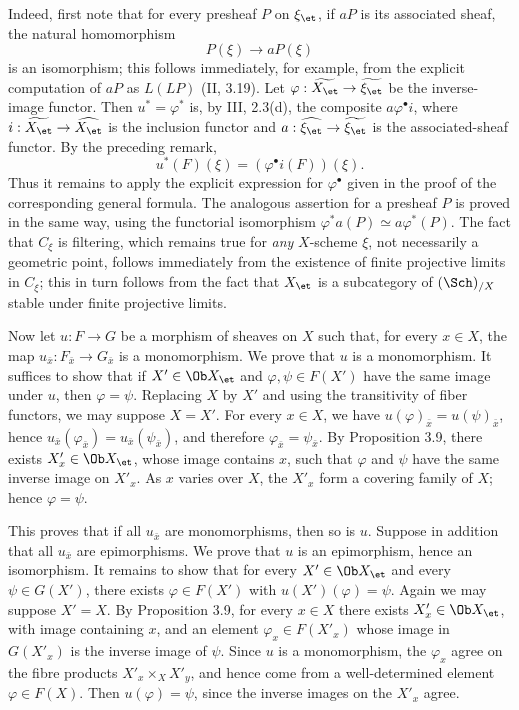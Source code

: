 Indeed, first note that for every presheaf \(P\) on \(\xi_{\et}\), if \(aP\) is its associated sheaf, the natural homomorphism
\[
P(\xi)\longrightarrow aP(\xi)
\]
is an isomorphism; this follows immediately, for example, from the explicit computation of \(aP\) as \(L(LP)\) (II, 3.19). Let \(\varphi:\widetilde{X_{\et}}\to\widetilde{\xi_{\et}}\) be the inverse-image functor. Then \(u^*=\varphi^*\) is, by III, 2.3(d), the composite \(a\varphi^\bullet i\), where \(i:\widetilde{X_{\et}}\to\widehat{X_{\et}}\) is the inclusion functor and \(a:\widehat{\xi_{\et}}\to\widetilde{\xi_{\et}}\) is the associated-sheaf functor. By the preceding remark,
\[
u^*(F)(\xi)=(\varphi^\bullet i(F))(\xi).
\]
Thus it remains to apply the explicit expression for \(\varphi^\bullet\) given in the proof of the corresponding general formula. The analogous assertion for a presheaf \(P\) is proved in the same way, using the functorial isomorphism \(\varphi^*a(P)\simeq a\varphi^*(P)\). The fact that \(C_\xi\) is filtering, which remains true for \emph{any} \(X\)-scheme \(\xi\), not necessarily a geometric point, follows immediately from the existence of finite projective limits in \(C_\xi\); this in turn follows from the fact that \(X_{\et}\) is a subcategory of \((\Sch)_{/X}\) stable under finite projective limits.

Now let \(u:F\to G\) be a morphism of sheaves on \(X\) such that, for every \(x\in X\), the map \(u_{\bar x}:F_{\bar x}\to G_{\bar x}\) is a monomorphism. We prove that \(u\) is a monomorphism. It suffices to show that if \(X'\in\Ob X_{\et}\) and \(\varphi,\psi\in F(X')\) have the same image under \(u\), then \(\varphi=\psi\). Replacing \(X\) by \(X'\) and using the transitivity of fiber functors, we may suppose \(X=X'\). For every \(x\in X\), we have \(u(\varphi)_{\bar x}=u(\psi)_{\bar x}\), hence \(u_{\bar x}(\varphi_{\bar x})=u_{\bar x}(\psi_{\bar x})\), and therefore \(\varphi_{\bar x}=\psi_{\bar x}\). By Proposition 3.9, there exists \(X'_x\in\Ob X_{\et}\), whose image contains \(x\), such that \(\varphi\) and \(\psi\) have the same inverse image on \(X'_x\). As \(x\) varies over \(X\), the \(X'_x\) form a covering family of \(X\); hence \(\varphi=\psi\).

This proves that if all \(u_{\bar x}\) are monomorphisms, then so is \(u\). Suppose in addition that all \(u_{\bar x}\) are epimorphisms. We prove that \(u\) is an epimorphism, hence an isomorphism. It remains to show that for every \(X'\in\Ob X_{\et}\) and every \(\psi\in G(X')\), there exists \(\varphi\in F(X')\) with \(u(X')(\varphi)=\psi\). Again we may suppose \(X'=X\). By Proposition 3.9, for every \(x\in X\) there exists \(X'_x\in\Ob X_{\et}\), with image containing \(x\), and an element \(\varphi_x\in F(X'_x)\) whose image in \(G(X'_x)\) is the inverse image of \(\psi\). Since \(u\) is a monomorphism, the \(\varphi_x\) agree on the fibre products \(X'_x\times_X X'_y\), and hence come from a well-determined element \(\varphi\in F(X)\). Then \(u(\varphi)=\psi\), since the inverse images on the \(X'_x\) agree. \qedtext

